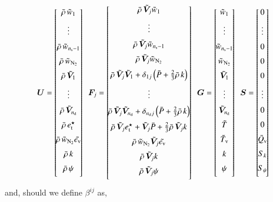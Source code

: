 \documentclass{warpdoc}
\newcommand{\alb}{\vspace{0.2cm}\\} %
\newcommand{\nd}{{{n}_{\rm d}}}
\newcommand{\ns}{{{n}_{\rm s}}}
\newcommand{\ev}{e_{\rm v}}
\newcommand{\etstar}{{e_{\rm t}^\star}}
\begin{document}
\begin{displaymath}
  \bm{U}=\left[\!
      \begin{array}{@{}c@{}}
        \wbar{\rho}\, \wtilde{w}_1 \alb
        \vdots \alb
        \wbar{\rho}\, \wtilde{w}_{\ns-1} \alb
        \wbar{\rho}\, \wtilde{w}_{\rm N_2} \alb
        \wbar{\rho}\, \wtilde{\bm{V}}_1 \alb
        \vdots \alb
        \wbar{\rho}\, \wtilde{\bm{V}}_\nd \alb
        \wbar{\rho}\, \etstar \alb
        \wbar{\rho}\, \wtilde{w}_{\rm N_2} {\wtilde{\ev}} \alb
        \wbar{\rho}\, k \alb
        \wbar{\rho}\, \psi \alb
      \end{array}
    \!\right]
~~    
  \bm{F}_j=\left[\!
      \begin{array}{@{}c@{}}
        \wbar{\rho}\, {\wtilde{\bm{V}}_j} \wtilde{w}_1 \alb
        \vdots \alb
        \wbar{\rho}\, {\wtilde{\bm{V}}_j} \wtilde{w}_{\ns-1} \alb
        \wbar{\rho}\, {\wtilde{\bm{V}}_j} \wtilde{w}_{\rm N_2} \alb
        \wbar{\rho}\, {\wtilde{\bm{V}}_j} \wtilde{\bm{V}}_1 + \delta_{1j}\left(\wbar{P}+\frac{2}{3} \wbar{\rho}\, k\right)\alb
        \vdots \alb
        \wbar{\rho}\, {\wtilde{\bm{V}}_j} \wtilde{\bm{V}}_\nd + \delta_{\nd j}\left(\wbar{P}+\frac{2}{3} \wbar{\rho}\, k\right)\alb
        \wbar{\rho}\, {\wtilde{\bm{V}}_j} \etstar+{\wtilde{\bm{V}}_j} \wbar{P}+\frac{2}{3}\wbar{\rho}\, {\wtilde{\bm{V}}_j} k \alb
        \wbar{\rho}\, \wtilde{w}_{\rm N_2} {\wtilde{\bm{V}}_j} {\wtilde{\ev}} \alb
        \wbar{\rho}\, {\wtilde{\bm{V}}_j} k \alb
        \wbar{\rho}\, {\wtilde{\bm{V}}_j} \psi \alb
      \end{array}
    \!\right]
~~    
  \bm{G}=\left[\!
      \begin{array}{@{}c@{}}
        \wtilde{w}_1 \alb
        \vdots \alb
        \wtilde{w}_{\ns-1} \alb
        {\wtilde{w}_{\rm N_2}} \alb
        \wtilde{\bm{V}}_1 \alb
        \vdots \alb
        \wtilde{\bm{V}}_\nd \alb
        \wtilde{T} \alb
        {\wtilde{T}_{\rm v}}\alb
        k \alb
        \psi \alb
      \end{array}
   \!\right]
~~  
  \bm{S}=\left[\!
      \begin{array}{@{}c@{}}
      0 \alb
      \vdots \alb
      0 \alb
      0 \alb
      0 \alb
      \vdots \alb
      0 \alb
      0 \alb
      \wbar{Q}_{\rm v} \alb
      S_k \alb
      S_\psi \alb
      \end{array}
   \!\right]
\end{displaymath}
%
and, should we define $\beta^{ij}$ as,
%
\end{document}
